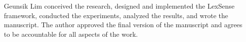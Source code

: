 \documentclass[pdflatex,sn-mathphys-num]{sn-jnl}%
\theoremstyle{thmstyleone}%
\theoremstyle{thmstyletwo}%
\theoremstyle{thmstylethree}%
\begin{document}
Geunsik Lim conceived the research, designed and implemented the LexSense framework, conducted the experiments, analyzed the results, and wrote the manuscript. The author approved the final version of the manuscript and agrees to be accountable for all aspects of the work.




 

%
\end{document}
